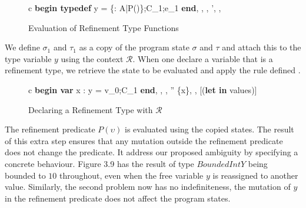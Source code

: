 \documentclass[a4paper,12pt]{report}
\begin{document}
\begin{figure}[H]
  \begin{center}
    \begin{tabular} {c}
      \footnotesize
      {\langle\textbf{begin typedef } y = \{\upsilon : A\text{ }|\text{ }P(\upsilon)\};C_1;e_1\textbf{ end}, 
      \sigma, \tau,  \rangle \longrightarrow \langle \sigma', \tau,  \rangle} 
      \normalsize
    \end{tabular}
  \end{center}
  \caption{Evaluation of Refinement Type Functions}
\end{figure}

\par
We define $\sigma_1$ and $\tau_1$ as a copy of the program state $\sigma$ and 
$\tau$ and attach this to the type variable $y$ using the context $\mathcal{R}$. 
When one declare a variable that is a refinement type, we retrieve the state to 
be evaluated and apply the rule defined .

\begin{figure}[H]
  \begin{center}
    \begin{tabular}{c}
      {\langle\textbf{begin var }x : y = v_0;C_1\textbf{ end}, \sigma, \tau,  \rangle 
      \longrightarrow \langle \sigma'' \setminus \{x\}, \tau,  \rangle} [(\textbf{let in} values)] 
    \end{tabular}
  \end{center}
  \caption{Declaring a Refinement Type with $\mathcal{R}$}
\end{figure}


\par
The refinement predicate $P(\upsilon)$ is evaluated using the copied 
states. The result of this extra step ensures that any mutation outside the 
refinement predicate does not change the predicate. It address our proposed 
ambiguity by specifying a concrete behaviour. Figure 3.9 has the result of type 
$BoundedIntY$ being bounded to $10$ throughout, even when the free variable $y$ 
is reassigned to another value. Similarly, the second problem now has no 
indefiniteness, the mutation of $y$ in the refinement predicate does not affect 
the program states. 
 
\end{document}
